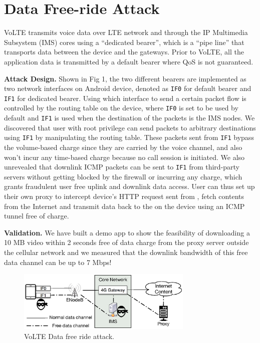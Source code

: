 \section{Data Free-ride Attack}
\label{sec:intro}
VoLTE transmits voice data over LTE network and through the IP Multimedia Subsystem (IMS) cores using a ``dedicated bearer'', which is a ``pipe line'' that transports data between the device and the gateways. Prior to VoLTE, all the application data is transmitted by a default bearer where QoS is not guaranteed.

\textbf{Attack Design. }Shown in Fig 1, the two different bearers are implemented as two network interfaces on Android device, denoted as \texttt{IF0} for default bearer and \texttt{IF1} for dedicated bearer. Using which interface to send a certain packet flow is controlled by the routing table on the device, where \texttt{IF0} is set to be used by default and \texttt{IF1} is used when the destination of the packets is the IMS nodes. We discovered that user with root privilege can send packets to arbitrary destinations using \texttt{IF1} by manipulating the routing table. These packets sent from \texttt{IF1} bypass the volume-based charge since they are carried by the voice channel, and also won't incur any time-based charge because no call session is initiated. We also unrevealed that downlink ICMP packets can be sent to \texttt{IF1} from third-party servers without getting blocked by the firewall or incurring any charge, which grants fraudulent user free uplink and downlink data access. User can thus set up their own proxy to intercept device's HTTP request sent from , fetch contents from the Internet and transmit data back to the  on the device using an ICMP tunnel free of charge. 

\textbf{Validation. }We have built a demo app to show the feasibility of downloading a 10 MB video within 2 seconds free of data charge from the proxy server outside the cellular network and we measured that the downlink bandwidth of this free data channel can be up to 7 Mbps! 

\begin{figure}[!t]
\hspace{-0.2in}
\centering
\includegraphics[width=3.3in]{figs/poster.eps}
\caption{VoLTE Data free ride attack.}
\vspace{-0.1in}
\label{fig:attack}
\end{figure}
